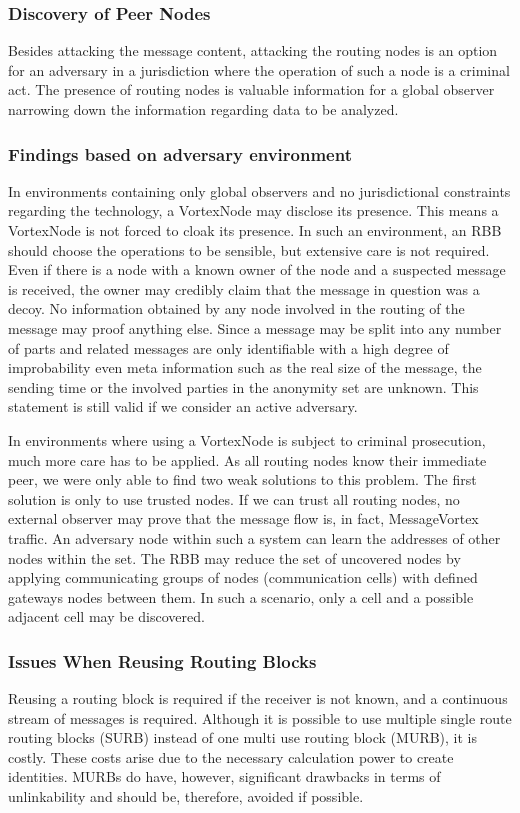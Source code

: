 \documentclass[10pt,journal,compsoc]{IEEEtran}
\begin{document}
\subsubsection{Discovery of Peer Nodes}
Besides attacking the message content, attacking the routing nodes is an option for an adversary in a jurisdiction where the operation of such a node is a criminal act. The presence of routing nodes is valuable information for a global observer narrowing down the information regarding data to be analyzed.

\subsubsection{Findings based on adversary environment}
In environments containing only global observers and no jurisdictional constraints regarding the technology, a VortexNode may disclose its presence. This means a VortexNode is not forced to cloak its presence. In such an environment, an RBB should choose the operations to be sensible, but extensive care is not required. Even if there is a node with a known owner of the node and a suspected message is received, the owner may credibly claim that the message in question was a decoy. No information obtained by any node involved in the routing of the message may proof anything else. Since a message may be split into any number of parts and related messages are only identifiable with a high degree of improbability even meta information such as the real size of the message, the sending time or the involved parties in the anonymity set are unknown. This statement is still valid if we consider an active adversary.

In environments where using a VortexNode is subject to criminal prosecution, much more care has to be applied. As all routing nodes know their immediate peer, we were only able to find two weak solutions to this problem. The first solution is only to use trusted nodes. If we can trust all routing nodes, no external observer may prove that the message flow is, in fact, MessageVortex traffic. An adversary node within such a system can learn the addresses of other nodes within the set. The RBB may reduce the set of uncovered nodes by applying communicating groups of nodes (communication cells) with defined gateways nodes between them. In such a scenario, only a cell and a possible adjacent cell may be discovered.

\subsubsection{Issues When Reusing Routing Blocks}
Reusing a routing block is required if the receiver is not known, and a continuous stream of messages is required. Although it is possible to use multiple single route routing blocks (SURB) instead of one multi use routing block (MURB), it is costly. These costs arise due to the necessary calculation power to create identities. MURBs do have, however, significant drawbacks in terms of unlinkability and should be, therefore, avoided if possible.
\end{document}
